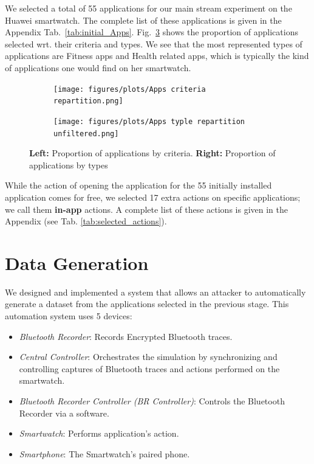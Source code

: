 We selected a total of 55 applications for our main stream experiment on the Huawei smartwatch. The complete list of these applications is given in the Appendix Tab.~\ref{tab:initial_Apps}. Fig.~\ref{fig:app proportio} shows the proportion of applications selected wrt. their criteria and types. We see that the most represented types of applications are Fitness apps and Health related apps, which is typically the kind of applications one would find on her smartwatch.

\begin{figure}[h]
\centering
\begin{subfigure}{.5\textwidth}
 \centering
  \texttt{[image: figures/plots/Apps criteria repartition.png]}
  \label{fig:sub1}
\end{subfigure}%
\begin{subfigure}{.5\textwidth}
  \centering
  \texttt{[image: figures/plots/Apps typle repartition unfiltered.png]}
  \label{fig:sub2}
\end{subfigure}
\caption{\textbf{Left:} Proportion of applications by criteria. \textbf{Right:} Proportion of applications by types}
\label{fig:app proportio}
\end{figure}


While the action of opening the application for the 55 initially installed application comes for free, we selected 17 extra actions on specific applications; we call them \textbf{in-app} actions. A complete list of these actions is given in the Appendix (see Tab. \ref{tab:selected_actions}).





\section{Data Generation}
\label{sec:data_generation}

We designed and implemented a system that allows an attacker to automatically generate a dataset from the applications selected in the previous stage. This automation system uses 5 devices:

\begin{itemize}
  \item \textit{Bluetooth Recorder}: Records Encrypted Bluetooth traces.
  \item \textit{Central Controller}: Orchestrates the simulation by synchronizing and controlling captures of Bluetooth traces and actions performed on the smartwatch.
  \item \textit{Bluetooth Recorder Controller (BR Controller)}: Controls the Bluetooth Recorder via a software.
  \item \textit{Smartwatch}: Performs application's action.
  \item \textit{Smartphone}: The Smartwatch's paired phone. 
\end{itemize}



